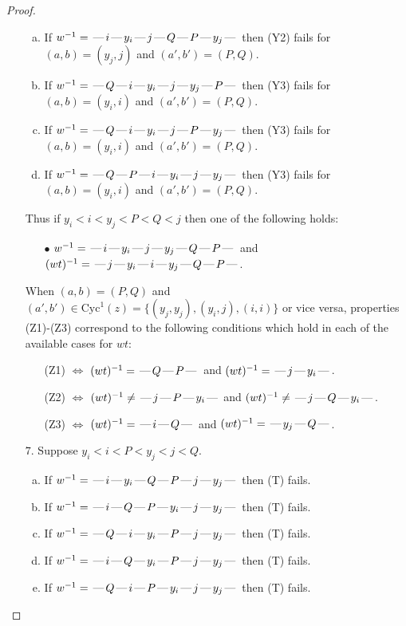\documentclass[10pt]{article}
\theoremstyle{definition}
\theoremstyle{definition}
\def\dash{\text{\hspace{0.5mm}---\hspace{0.5mm}}}
\def\Cyc{\mathrm{Cyc}}
\begin{document}
\begin{proof}
\begin{enumerate}
\begin{enumerate}[(a)]
\item If $w^{-1} = \dash i\dash y_i\dash j\dash Q\dash P\dash y_j\dash $ then (Y2) fails for $(a,b)=(y_j,j)$ and $(a',b')=(P,Q)$.
\item If $w^{-1} = \dash Q\dash i\dash y_i\dash j\dash y_j\dash P\dash $ then (Y3) fails for $(a,b)=(y_i,i)$ and $(a',b')=(P,Q)$.
\item If $w^{-1} = \dash Q\dash i\dash y_i\dash j\dash P\dash y_j\dash $ then (Y3) fails for $(a,b)=(y_i,i)$ and $(a',b')=(P,Q)$.
\item If $w^{-1} = \dash Q\dash P\dash i\dash y_i\dash j\dash y_j\dash $ then (Y3) fails for $(a,b)=(y_i,i)$ and $(a',b')=(P,Q)$.
\end{enumerate}
Thus if $y_i < i < y_j < P < Q < j$ then one of the following holds:
\begin{enumerate}
\item[$\bullet$] $w^{-1} = \dash i\dash y_i\dash j\dash y_j\dash Q\dash P\dash $ and $(wt)^{-1} = \dash j\dash y_i\dash i\dash y_j\dash Q\dash P\dash $.
\end{enumerate}
When $(a,b)= (P,Q)$ and $(a',b')\in \Cyc^1(z)=\{(y_j,y_j),(y_i,j),(i,i)\}$ or vice versa,
properties (Z1)-(Z3) correspond to the following conditions which
hold in each of the available cases for $wt$:
\begin{enumerate}
\item[](Z1) $\Leftrightarrow$ $(wt)^{-1} = \dash Q \dash P \dash$  and $(wt)^{-1} = \dash j \dash y_i \dash$.
\item[](Z2) $\Leftrightarrow$ $(wt)^{-1} \neq \dash j \dash P \dash y_i \dash$ and $(wt)^{-1}\neq \dash j \dash Q \dash y_i \dash$.
\item[](Z3) $\Leftrightarrow$ $(wt)^{-1} = \dash i \dash Q \dash$  and $(wt)^{-1} = \dash y_j \dash Q \dash$.
\end{enumerate}
\item[$7$.] Suppose $y_i < i < P < y_j < j < Q$.
\begin{enumerate}[(a)]
\item If $w^{-1} = \dash i\dash y_i\dash Q\dash P\dash j\dash y_j\dash $ then (T) fails.
\item If $w^{-1} = \dash i\dash Q\dash P\dash y_i\dash j\dash y_j\dash $ then (T) fails.
\item If $w^{-1} = \dash Q\dash i\dash y_i\dash P\dash j\dash y_j\dash $ then (T) fails.
\item If $w^{-1} = \dash i\dash Q\dash y_i\dash P\dash j\dash y_j\dash $ then (T) fails.
\item If $w^{-1} = \dash Q\dash i\dash P\dash y_i\dash j\dash y_j\dash $ then (T) fails.

\end{enumerate}
\end{enumerate}
\end{proof}
\end{document}
